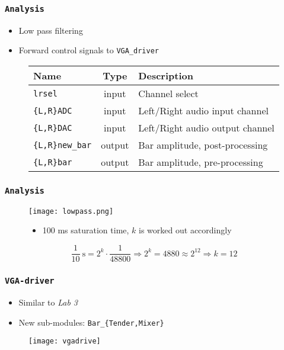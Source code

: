 \begin{frame}
  \frametitle{\texttt{Analysis}}
    \begin{itemize}
      \item Low pass filtering
      \item Forward control signals to \texttt{VGA\_driver}
    \end{itemize}
    \begin{figure}
      \centering
      \begin{tabular}{|l|c|l|}
        \hline
        Name & Type & Description \\    \hline
        \texttt{lrsel} & input & Channel select \\    \hline
        \texttt{\{L,R\}ADC} & input & Left/Right audio input channel \\    \hline
        \texttt{\{L,R\}DAC} & input & Left/Right audio output channel \\    \hline
        \texttt{\{L,R\}new\_bar} & output & Bar amplitude, post-processing\\    \hline
        \texttt{\{L,R\}bar} & output & Bar amplitude, pre-processing\\    \hline
      \end{tabular}
    \end{figure}
\end{frame}

\begin{frame}
  \frametitle{\texttt{Analysis}}
	\begin{figure}
	  \texttt{[image: lowpass.png]}
	  \begin{itemize}
	    \item 100 ms saturation time, $k$ is worked out accordingly
	  \end{itemize}
	  $$\frac{1}{10}\mathrm{\ s} = 2^k\cdot\frac{1}{48800}\Rightarrow 2^k=4880\approx 2^{12}\Rightarrow k = 12$$
	\end{figure}
\end{frame}

\begin{frame}
  \frametitle{\texttt{VGA-driver}}
    \begin{itemize}
      \item Similar to \emph{Lab 3} 
      \item New sub-modules: \texttt{Bar\_\{Tender,Mixer\}}
    \end{itemize}
    \begin{figure}
      \centering
      \texttt{[image: vgadrive]}
    \end{figure}
\end{frame}

